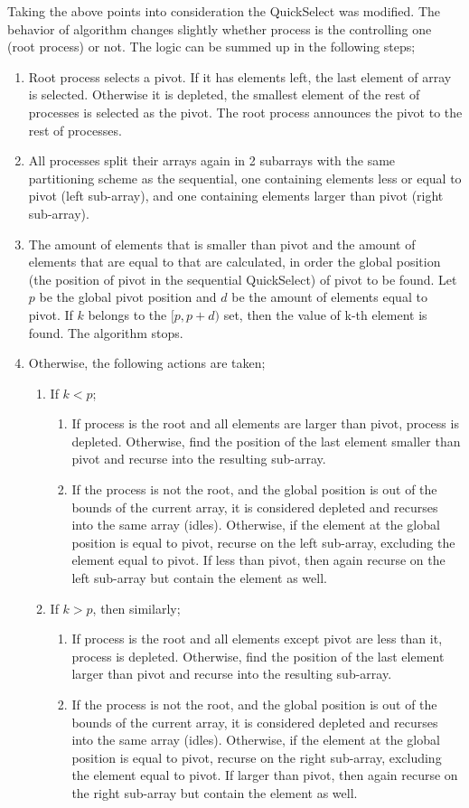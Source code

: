 \documentclass[11pt]{article}
\begin{document}
Taking the above points into consideration the QuickSelect was modified. The behavior of algorithm changes slightly whether process is the controlling one (root process) or not. The logic can be summed up in the following steps;
\begin{enumerate}
\item Root process selects a pivot. If it has elements left, the last element of array is selected. Otherwise it is depleted, the smallest element of the rest of processes is selected as the pivot. The root process announces the pivot to the rest of processes.
\item All processes split their arrays again in 2 subarrays with the same partitioning scheme as the sequential, one containing elements less or equal to pivot (left sub-array), and one containing elements larger than pivot (right sub-array).
\item The amount of elements that is smaller than pivot and the amount of elements that are equal to that are calculated, in order the global position (the position of pivot in the sequential QuickSelect) of pivot to be found. Let \(p\) be the global pivot position and \(d\) be the amount of elements equal to pivot. If \(k\) belongs to the \([p, p+d)\) set, then the value of k-th element is found. The algorithm stops.
\item Otherwise, the following actions are taken;
\begin{enumerate}
\item If \(k < p\);
\begin{enumerate}
\item If process is the root and all elements are larger than pivot, process is depleted. Otherwise, find the position of the last element smaller than pivot and recurse into the resulting sub-array.
\item If the process is not the root, and the global position is out of the bounds of the current array, it is considered depleted and recurses into the same array (idles). Otherwise, if the element at the global position is equal to pivot, recurse on the left sub-array, excluding the element equal to pivot. If less than pivot, then again recurse on the left sub-array but contain the element as well.
\end{enumerate}
\item If \(k > p\), then similarly;
\begin{enumerate}
\item If process is the root and all elements except pivot are less than it, process is depleted. Otherwise, find the position of the last element larger than pivot and recurse into the resulting sub-array.
\item If the process is not the root, and the global position is out of the bounds of the current array, it is considered depleted and recurses into the same array (idles). Otherwise, if the element at the global position is equal to pivot, recurse on the right sub-array, excluding the element equal to pivot. If larger than pivot, then again recurse on the right sub-array but contain the element as well.
\end{enumerate}
\end{enumerate}
\end{enumerate}
\pagebreak
\end{document}
